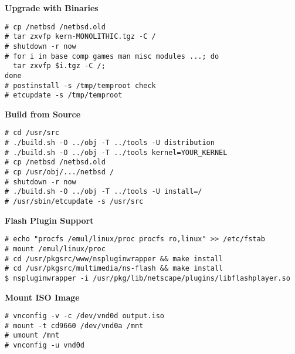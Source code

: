 \documentclass[10pt]{article}
\begin{document}
\begin{multicols}{2}
\textbf{\color{blueheader}Upgrade with Binaries}
\begin{lstlisting}
# cp /netbsd /netbsd.old
# tar zxvfp kern-MONOLITHIC.tgz -C /
# shutdown -r now
# for i in base comp games man misc modules ...; do 
  tar zxvfp $i.tgz -C /; 
done
# postinstall -s /tmp/temproot check
# etcupdate -s /tmp/temproot
\end{lstlisting}

\textbf{\color{blueheader}Build from Source}
\begin{lstlisting}
# cd /usr/src
# ./build.sh -O ../obj -T ../tools -U distribution
# ./build.sh -O ../obj -T ../tools kernel=YOUR_KERNEL
# cp /netbsd /netbsd.old
# cp /usr/obj/.../netbsd /
# shutdown -r now
# ./build.sh -O ../obj -T ../tools -U install=/
# /usr/sbin/etcupdate -s /usr/src
\end{lstlisting}

\textbf{\color{blueheader}Flash Plugin Support}
\begin{lstlisting}
# echo "procfs /emul/linux/proc procfs ro,linux" >> /etc/fstab
# mount /emul/linux/proc
# cd /usr/pkgsrc/www/nspluginwrapper && make install
# cd /usr/pkgsrc/multimedia/ns-flash && make install
$ nspluginwrapper -i /usr/pkg/lib/netscape/plugins/libflashplayer.so
\end{lstlisting}

\textbf{\color{blueheader}Mount ISO Image}
\begin{lstlisting}
# vnconfig -v -c /dev/vnd0d output.iso
# mount -t cd9660 /dev/vnd0a /mnt
# umount /mnt
# vnconfig -u vnd0d
\end{lstlisting}

\end{multicols}
\end{document}
